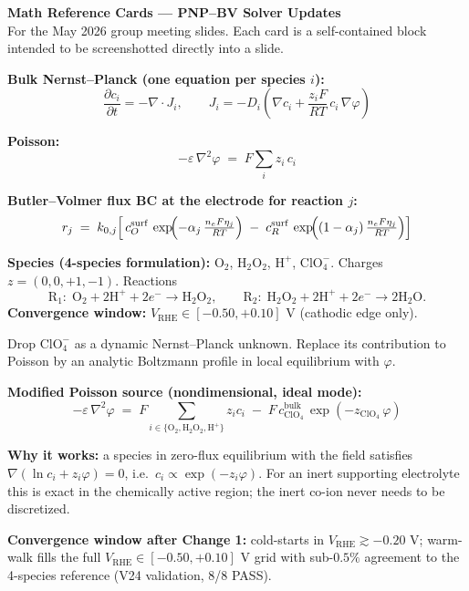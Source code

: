 \documentclass[11pt]{article}
\newcommand{\VRHE}{V_{\mathrm{RHE}}}
\begin{document}
\begin{center}
  {\Large\bfseries Math Reference Cards --- PNP--BV Solver Updates}\\[2pt]
  {\small For the May 2026 group meeting slides. Each card is a
  self-contained block intended to be screenshotted directly into a
  slide.}
\end{center}

\begin{tcolorbox}[cardstyle={Baseline: 4-species PNP-BV (pre-rebuild)}]
\textbf{Bulk Nernst--Planck (one equation per species $i$):}
\[
  \frac{\partial c_i}{\partial t}
   = -\nabla\!\cdot J_i,\qquad
  J_i = -D_i\!\left(\nabla c_i + \frac{z_i F}{RT}\,c_i\,\nabla\varphi\right)
\]

\textbf{Poisson:}
\[
  -\varepsilon\,\nabla^{2}\varphi \;=\; F\sum_{i} z_i\,c_i
\]

\textbf{Butler--Volmer flux BC at the electrode for reaction $j$:}
\[
  r_j \;=\; k_{0,j}\!\left[\,
  c_O^{\mathrm{surf}}\,\exp\!\Bigl(-\alpha_j\,\tfrac{n_e F\eta_j}{RT}\Bigr)
  \;-\;
  c_R^{\mathrm{surf}}\,\exp\!\Bigl((1-\alpha_j)\,\tfrac{n_e F\eta_j}{RT}\Bigr)
  \right]
\]

\textbf{Species (4-species formulation):} \(\mathrm{O_2}\),
\(\mathrm{H_2O_2}\), \(\mathrm{H^+}\), \(\mathrm{ClO_4^-}\). Charges
\(z = (0, 0, +1, -1)\). Reactions
\[
  \mathrm{R_1}:\;\mathrm{O_2} + 2\mathrm{H^+} + 2e^{-}\!\to\mathrm{H_2O_2},
  \qquad
  \mathrm{R_2}:\;\mathrm{H_2O_2} + 2\mathrm{H^+} + 2e^{-}\!\to 2\mathrm{H_2O}.
\]
\textbf{Convergence window:} \(\VRHE\in[-0.50,+0.10]\) V (cathodic
edge only).
\end{tcolorbox}

\begin{tcolorbox}[cardstyle={Change 1: 3-species + analytic Boltzmann counterion}]
Drop \(\mathrm{ClO_4^-}\) as a dynamic Nernst--Planck unknown. Replace
its contribution to Poisson by an analytic Boltzmann profile in
local equilibrium with \(\varphi\).

\textbf{Modified Poisson source (nondimensional, ideal mode):}
\[
  -\varepsilon\,\nabla^{2}\varphi \;=\;
  F\!\!\sum_{i\in\{\mathrm{O_2,H_2O_2,H^+}\}}\!\! z_i c_i
  \;-\; F\,c_{\mathrm{ClO_4}}^{\mathrm{bulk}}\,\exp(-z_{\mathrm{ClO_4}}\,\varphi)
\]

\textbf{Why it works:} a species in zero-flux equilibrium with the
field satisfies
\(\nabla(\ln c_i + z_i\varphi) = 0\), i.e.\
\(c_i \propto \exp(-z_i\varphi)\). For an inert supporting electrolyte
this is exact in the chemically active region; the inert co-ion never
needs to be discretized.

\textbf{Convergence window after Change 1:} cold-starts in
\(\VRHE\gtrsim -0.20\) V; warm-walk fills the full
\(\VRHE\in[-0.50,+0.10]\) V grid with sub-\(0.5\%\) agreement to the
4-species reference (V24 validation, 8/8 PASS).
\end{tcolorbox}
\end{document}
